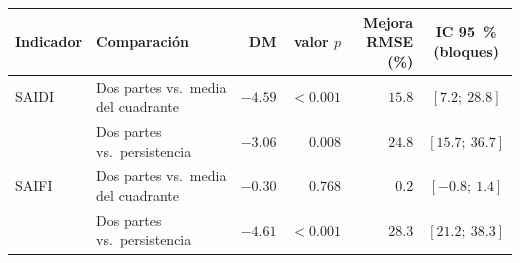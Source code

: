 \begin{tabular}{l l r r r c}
\toprule
\textbf{Indicador} & \textbf{Comparación} & \textbf{DM} & \textbf{valor $p$} & \makecell[c]{\textbf{Mejora}\\\textbf{RMSE (\%)}} & \makecell[c]{\textbf{IC 95~\%}\\\textbf{(bloques)}} \\
\midrule
SAIDI & Dos partes vs.\ media del cuadrante & $-4{.}59$ & $<0{.}001$ & $15{.}8$ & $[7{.}2;\ 28{.}8]$ \\
 & Dos partes vs.\ persistencia & $-3{.}06$ & $0{.}008$ & $24{.}8$ & $[15{.}7;\ 36{.}7]$ \\
SAIFI & Dos partes vs.\ media del cuadrante & $-0{.}30$ & $0{.}768$ & $0{.}2$ & $[-0{.}8;\ 1{.}4]$ \\
 & Dos partes vs.\ persistencia & $-4{.}61$ & $<0{.}001$ & $28{.}3$ & $[21{.}2;\ 38{.}3]$ \\
\bottomrule
\end{tabular}
